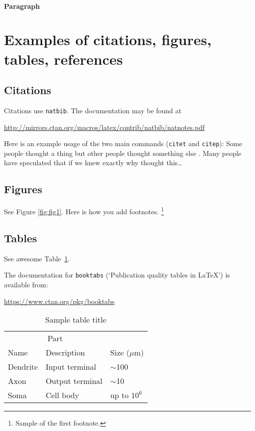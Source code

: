\documentclass{article}
\begin{document}
\paragraph{Paragraph}
\lipsum[7]



\section{Examples of citations, figures, tables, references}
\label{sec:others}

\subsection{Citations}
Citations use \verb+natbib+. The documentation may be found at
\begin{center}
	\url{http://mirrors.ctan.org/macros/latex/contrib/natbib/natnotes.pdf}
\end{center}

Here is an example usage of the two main commands (\verb+citet+ and \verb+citep+): Some people thought a thing \citep{kour2014real, hadash2018estimate} but other people thought something else \citep{kour2014fast}. Many people have speculated that if we knew exactly why \citet{kour2014fast} thought this\dots

\subsection{Figures}
\lipsum[10]
See Figure \ref{fig:fig1}. Here is how you add footnotes. \footnote{Sample of the first footnote.}
\lipsum[11]


\subsection{Tables}
See awesome Table~\ref{tab:table}.

The documentation for \verb+booktabs+ (`Publication quality tables in LaTeX') is available from:
\begin{center}
	\url{https://www.ctan.org/pkg/booktabs}
\end{center}


\begin{table}
	\caption{Sample table title}
	\centering
	\begin{tabular}{lll}
		\toprule
		\multicolumn{2}{c}{Part}                   \\
		\cmidrule(r){1-2}
		Name     & Description     & Size ($\mu$m) \\
		\midrule
		Dendrite & Input terminal  & $\sim$100     \\
		Axon     & Output terminal & $\sim$10      \\
		Soma     & Cell body       & up to $10^6$  \\
		\bottomrule
	\end{tabular}
	\label{tab:table}
\end{table}
\end{document}
